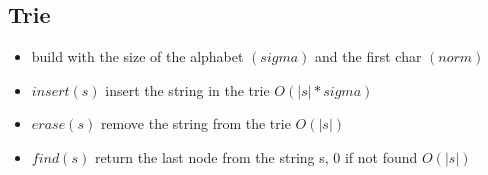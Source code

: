 \subsection{Trie}

\begin{itemize}
  \item build with the size of the alphabet $(sigma)$ and the first char $(norm)$
  \item $insert(s)$ insert the string in the trie $O(|s|*sigma)$
  \item $erase(s)$ remove the string from the trie $O(|s|)$
  \item $find(s)$ return the last node from the string s, 0 if not found $O(|s|)$
\end{itemize}
